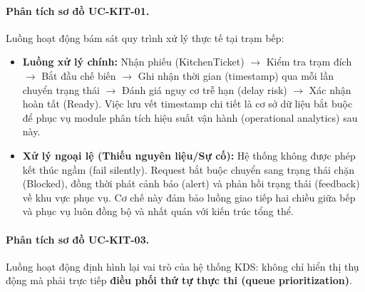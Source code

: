 \paragraph{Phân tích sơ đồ UC-KIT-01.}
Luồng hoạt động bám sát quy trình xử lý thực tế tại trạm bếp:

\begin{itemize}
    \item \textbf{Luồng xử lý chính:} Nhận phiếu (\textsf{KitchenTicket}) $\rightarrow$ Kiểm tra trạm đích $\rightarrow$ Bắt đầu chế biến $\rightarrow$ Ghi nhận thời gian (timestamp) qua mỗi lần chuyển trạng thái $\rightarrow$ Đánh giá nguy cơ trễ hạn (delay risk) $\rightarrow$ Xác nhận hoàn tất (\textsf{Ready}). Việc lưu vết timestamp chi tiết là cơ sở dữ liệu bắt buộc để phục vụ module phân tích hiệu suất vận hành (operational analytics) sau này.
    
    \item \textbf{Xử lý ngoại lệ (Thiếu nguyên liệu/Sự cố):} Hệ thống không được phép kết thúc ngầm (fail silently). Request bắt buộc chuyển sang trạng thái chặn (\textsf{Blocked}), đồng thời phát cảnh báo (alert) và phản hồi trạng thái (feedback) về khu vực phục vụ. Cơ chế này đảm bảo luồng giao tiếp hai chiều giữa bếp và phục vụ luôn đồng bộ và nhất quán với kiến trúc tổng thể.
\end{itemize}


\paragraph{Phân tích sơ đồ UC-KIT-03.}
Luồng hoạt động định hình lại vai trò của hệ thống KDS: không chỉ hiển thị thụ động mà phải trực tiếp \textbf{điều phối thứ tự thực thi (queue prioritization)}.

